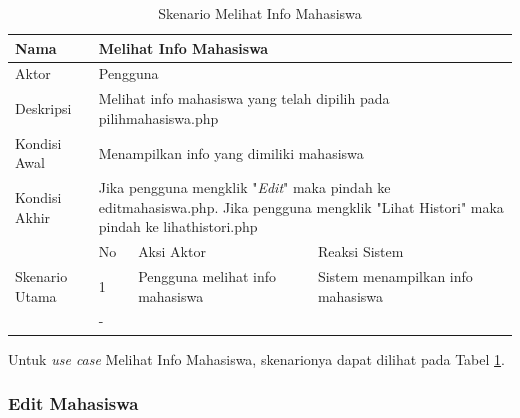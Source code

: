 \begin{table}
\centering
\caption[Tabel Skenario Melihat Info Mahasiswa]{Skenario Melihat Info Mahasiswa}
\label{tab:skenarioinfo}
\begin{tabular}{|p{1.4cm}|p{0.4cm}|p{2cm}|p{2cm}|p{2cm}|p{2cm}|}
\hline
Nama & \multicolumn{5}{p{8cm}|}{Melihat Info Mahasiswa} \\ \hline
Aktor & \multicolumn{5}{p{8cm}|}{Pengguna} \\ \hline
Deskripsi & \multicolumn{5}{p{8cm}|}{Melihat info mahasiswa yang telah dipilih
pada pilihmahasiswa.php} \\ \hline Kondisi Awal &
\multicolumn{5}{p{8cm}|}{Menampilkan info yang dimiliki mahasiswa} \\ \hline
Kondisi Akhir & \multicolumn{5}{p{8cm}|}{Jika pengguna mengklik "{\it Edit}"
maka pindah ke editmahasiswa.php. Jika pengguna mengklik "Lihat Histori" maka
pindah ke lihathistori.php} \\ \hline
\multirow{3}{*}{\parbox{1.4cm}{Skenario Utama}} & No &
\multicolumn{2}{p{4cm}|}{Aksi Aktor} & \multicolumn{2}{p{4cm}|}{Reaksi Sistem}
\\ \cline{2-6}
& 1 & \multicolumn{2}{p{4cm}|}{Pengguna melihat info mahasiswa} &
\multicolumn{2}{p{4cm}|}{Sistem menampilkan info mahasiswa} \\ \hline
Eksepsi & \multicolumn{5}{p{8cm}|}{-} \\ \hline
\end{tabular}
\end{table}

Untuk {\it use case} Melihat Info Mahasiswa, skenarionya dapat dilihat pada
Tabel \ref{tab:skenarioinfo}.

\subsubsection{Edit Mahasiswa}

